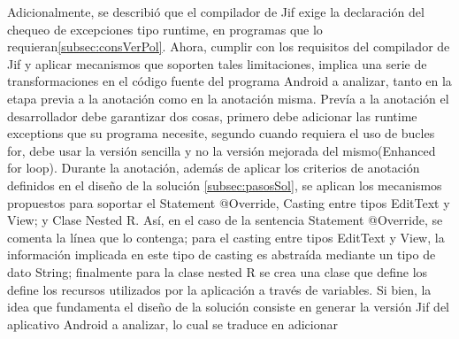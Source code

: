 % 
Adicionalmente, se describió que el compilador de Jif exige la declaración del
chequeo de excepciones tipo runtime, en programas que lo
requieran\ref{subsec:consVerPol}. Ahora, cumplir con los requisitos del
compilador de Jif y aplicar mecanismos que soporten tales limitaciones, implica
una serie de transformaciones en el código fuente del programa Android a
analizar, tanto en la etapa previa a la anotación como en la anotación
misma.\newline
Prevía a la anotación el desarrollador debe garantizar dos cosas, primero debe
adicionar las runtime exceptions que su programa necesite, segundo cuando
requiera el uso de bucles for, debe usar la versión sencilla y no la versión
mejorada del mismo(Enhanced for loop).\newline 
Durante la anotación, además de aplicar los criterios de anotación definidos en
el diseño de la solución \ref{subsec:pasosSol}, se aplican los mecanismos
propuestos para soportar el Statement @Override, Casting entre tipos EditText y
View; y Clase Nested R. Así, en el caso de  la sentencia Statement @Override, se
comenta la línea que lo contenga; para el casting entre tipos EditText y View,
la información implicada en este tipo de casting es abstraída mediante un tipo
de dato String; finalmente para la clase nested R se crea una clase que define
los define los recursos utilizados por la aplicación a través de
variables.\newline 
Si bien, la idea que fundamenta el diseño de la solución consiste en generar la
versión Jif del aplicativo Android a analizar, lo cual se traduce en adicionar
